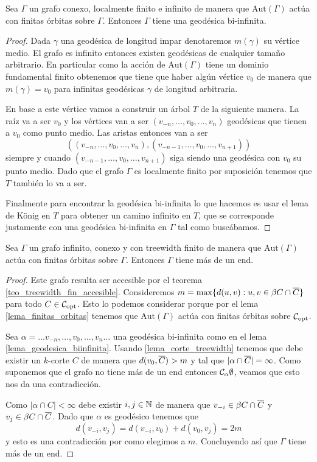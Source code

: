 \documentclass[tesis.tex]{subfiles}
\newcommand{\aut}{\text{Aut}}
\begin{document}
\begin{lema}\label{lema_geodesica_biinfinita}
	Sea $\Gamma$ un grafo conexo, localmente finito e infinito de manera que $\aut(\Gamma)$ actúa con finitas órbitas sobre $\Gamma$.
	Entonces $\Gamma$ tiene una geodésica bi-infinita.
\end{lema}
\begin{proof}
	Dada $\gamma$ una geodésica de longitud impar denotaremos $m(\gamma)$ su vértice medio.	
	El grafo es infinito entonces existen geodésicas de cualquier tamaño arbitrario.
	En particular como la acción de $\aut(\Gamma)$ tiene un dominio fundamental finito obtenemos que tiene que haber algún vértice $v_0$ de manera que $m(\gamma) = v_0$ para infinitas geodésicas $\gamma$ de longitud arbitraria.
	
	En base a este vértice vamos a construir un árbol $T$ de la siguiente manera.
	La raíz va a ser $v_0$ y los vértices van a ser $(v_{-n},\dots, v_0,\dots,v_n)$ geodésicas que tienen a $v_0$ como punto medio.
	Las aristas entonces van a ser 
	\[
		((v_{-n},\dots, v_0,\dots,v_n), (v_{-n-1},\dots, v_0,\dots,v_{n+1}))
	\]
	siempre y cuando $(v_{-n-1},\dots, v_0,\dots,v_{n+1})$ siga siendo una geodésica con $v_0$ su punto medio.
	Dado que el grafo $\Gamma$ es localmente finito por suposición tenemos que $T$ también lo va a ser.
	
	Finalmente para encontrar la geodésica bi-infinita lo que hacemos es usar el lema de König en $T$ para obtener un camino infinito en $T$, que se corresponde justamente con una geodésica bi-infinita en $\Gamma$ tal como buscábamos.
	
\end{proof}

\begin{lema}
	Sea $\Gamma$ un grafo infinito, conexo y con treewidth finito de manera que $\aut(\Gamma)$ actúa con finitas órbitas sobre $\Gamma$.
	Entonces $\Gamma$ tiene más de un end.
\end{lema}
\begin{proof}
	Este grafo resulta ser accesible por el teorema \ref{teo_treewidth_fin_accesible}.
	Consideremos $m = \max \{  d(u,v) : u,v \in \beta C \cap \overline C \}$ para todo $C \in {\cal C}_{\text{opt}}$.
	Esto lo podemos considerar porque por el lema \ref{lema_finitas_orbitas} tenemos que $\aut(\Gamma)$ actúa con finitas órbitas sobre ${\cal C}_{\text{opt}}$.
	
	Sea $\alpha = \dots v_{-n}, \dots, v_{0}, \dots, v_{n} \dots$ una geodésica bi-infinita como en el lema \ref{lema_geodesica_biinfinita}.
	Usando \ref{lema_corte_treewidth} tenemos que debe existir un $k$-corte $C$ de manera que $d(v_{0}, \overline C) > m$ y tal que $|\alpha \cap \overline C|=\infty$.
	Como suponemos que el grafo no tiene más de un end entonces ${\cal{C}}_{\alpha} \emptyset$, veamos que esto nos da una contradicción.
	
	Como $|\alpha \cap C| < \infty$ debe existir $i,j \in \mathbb{N}$ de manera que $v_{-i} \in \beta C \cap \overline C$ y $v_{j} \in \beta C \cap \overline C$.
	Dado que $\alpha$ es geodésico tenemos que
	\[
		d(v_{-i},v_{j}) = d(v_{-i},v_{0}) + d(v_{0}, v_{j}) = 2m
	\]
	y esto es una contradicción por como elegimos a $m$. 
	Concluyendo así que $\Gamma$ tiene más de un end.
\end{proof}
\end{document}
